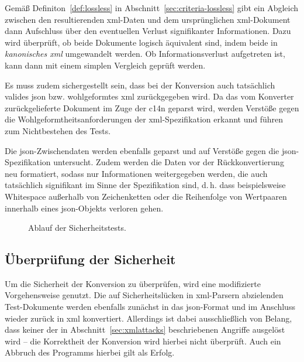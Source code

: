Gemäß Definiton~\ref{def:lossless} in Abschnitt~\ref{sec:criteria-lossless} gibt ein Abgleich zwischen den resultierenden \acrshort{xml}-Daten und dem ursprünglichen \acrshort{xml}-Dokument dann Aufschluss über den eventuellen Verlust signifikanter Informationen. Dazu wird überprüft, ob beide Dokumente logisch äquivalent sind, indem beide in \emph{kanonisches \acrshort{xml}} umgewandelt werden. Ob Informationsverlust aufgetreten ist, kann dann mit einem simplen Vergleich geprüft werden.

Es muss zudem sichergestellt sein, dass bei der Konversion auch tatsächlich valides \acrshort{json} bzw. wohlgeformtes \acrshort{xml} zurückgegeben wird. Da das vom Konverter zurückgelieferte Dokument im Zuge der \acrlong{c14n} geparst wird, werden Verstöße gegen die Wohlgeformtheitsanforderungen der \acrshort{xml}-Spezifikation erkannt und führen zum Nichtbestehen des Tests.

Die \acrshort{json}-Zwischendaten werden ebenfalls geparst und auf Verstöße gegen die \acrshort{json}-Spezifikation untersucht. Zudem werden die Daten vor der Rückkonvertierung neu formatiert, sodass nur Informationen weitergegeben werden, die auch tatsächlich signifikant im Sinne der Spezifikation sind, d.\,h. dass beispielsweise Whitespace außerhalb von Zeichenketten oder die Reihenfolge von Wertpaaren innerhalb eines \acrshort{json}-Objekts verloren gehen.

\begin{figure}[b!]
    \begin{center}
        
        \caption{Ablauf der Sicherheitstests.}
    \end{center}
\end{figure}

\subsection{Überprüfung der Sicherheit}
\label{sec:method-sec}

Um die Sicherheit der Konversion zu überprüfen, wird eine modifizierte Vorgehensweise genutzt. Die auf Sicherheitslücken in \acrshort{xml}-Parsern abzielenden Test-Dokumente werden ebenfalls zunächst in das \acrshort{json}-Format und im Anschluss wieder zurück in \acrshort{xml} konvertiert. Allerdings ist dabei ausschließlich von Belang, dass keiner der in Abschnitt~\ref{sec:xmlattacks} beschriebenen Angriffe ausgelöst wird -- die Korrektheit der Konversion wird hierbei nicht überprüft. Auch ein Abbruch des Programms hierbei gilt als Erfolg.

